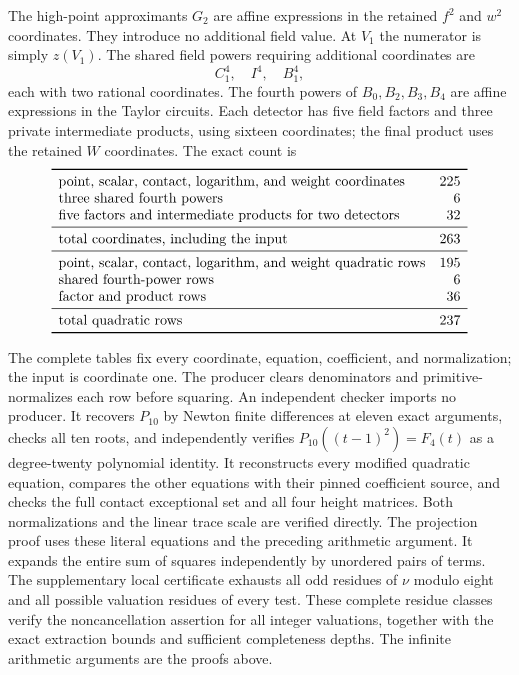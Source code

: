 \documentclass[11pt,a4paper]{article}
\begin{document}
The high-point approximants $G_2$ are affine expressions in the
retained $f^2$ and $w^2$ coordinates. They introduce no additional
field value. At $V_1$ the numerator is simply $z(V_1)$.
The shared field powers requiring additional coordinates are
\[
                              C_1^4,\quad I^4,\quad B_1^4,
\]
each with two rational coordinates. The fourth powers of
$B_0,B_2,B_3,B_4$ are affine expressions in the Taylor circuits.
Each detector has five field factors and three private intermediate
products, using sixteen coordinates; the final product uses the
retained $W$ coordinates. The exact count is
\[
\begin{array}{lr}\toprule
\text{point, scalar, contact, logarithm, and weight coordinates}&225\\
\text{three shared fourth powers}&6\\
\text{five factors and intermediate products for two detectors}&32\\\midrule
\text{total coordinates, including the input}&263\\\midrule
\text{point, scalar, contact, logarithm, and weight quadratic rows}&195\\
\text{shared fourth-power rows}&6\\
\text{factor and product rows}&36\\\midrule
\text{total quadratic rows}&237\\\bottomrule
\end{array}
\]

The complete tables fix every coordinate, equation, coefficient, and
normalization; the input is coordinate one. The producer clears
denominators and primitive-normalizes each row before squaring.
An independent checker imports no producer. It recovers $P_{10}$ by
Newton finite differences at eleven exact arguments, checks all ten roots,
and independently verifies $P_{10}((t-1)^2)=F_4(t)$ as a degree-twenty
polynomial identity. It reconstructs every modified quadratic equation,
compares the other equations with their pinned coefficient source, and
checks the full contact exceptional set and all four height matrices.
Both normalizations and the linear trace scale are verified directly.
The projection proof uses these literal equations and the preceding
arithmetic argument.
It expands the entire sum of squares independently by unordered
pairs of terms. The supplementary local certificate exhausts all
odd residues of $\nu$ modulo eight and all possible valuation residues
of every test. These complete residue classes verify the
noncancellation assertion for all integer valuations, together with
the exact extraction bounds and sufficient completeness depths.
The infinite arithmetic arguments are the proofs above.
\end{document}
